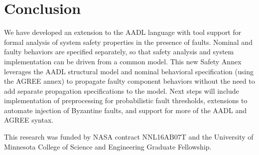 \section{Conclusion}

We have developed an extension to the AADL language with tool support for formal analysis of system safety properties in the presence of faults.  Nominal and faulty behaviors are specified separately, so that safety analysis and system implementation can be driven from a common model. This new Safety Annex leverages the AADL structural model and nominal behavioral specification (using the AGREE annex) to propagate faulty component behaviors without the need to add separate propagation specifications to the model.   Next steps will include implementation of preprocessing for probabilistic fault thresholds, extensions to automate injection of Byzantine faults, and support for more of the AADL and AGREE syntax.  

 This research was funded by NASA contract NNL16AB07T and the University of Minnesota College of Science and Engineering Graduate Fellowship.


